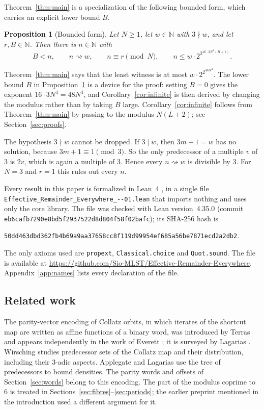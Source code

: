 \documentclass[11pt,reqno,oneside]{amsart}
\theoremstyle{plain}
\newtheorem{proposition}[theorem]{Proposition}
\theoremstyle{definition}
\numberwithin{equation}{section}
\newcommand{\lean}[1]{\texttt{#1}}
\begin{document}
Theorem~\ref{thm:main} is a specialization of the following bounded form, which carries an explicit lower bound $B$.

\begin{proposition}[Bounded form]\label{prop:bounded}
Let $N\ge1$, let $w\in\mathbb N$ with $3\nmid w$, and let $r,B\in\mathbb N$. Then there is $n\in\mathbb N$ with
\[
B<n,\qquad n\rightsquigarrow w,\qquad n\equiv r\pmod N,\qquad n\le w\cdot 2^{2^{16\cdot 3N^4(B+1)}}.
\]
\end{proposition}

Theorem~\ref{thm:main} says that the least witness is at most $w\cdot2^{2^{48N^4}}$. The lower bound $B$ in Proposition~\ref{prop:bounded} is a device for the proof: setting $B=0$ gives the exponent $16\cdot3N^4=48N^4$, and Corollary~\ref{cor:infinite} is then derived by changing the modulus rather than by taking $B$ large. Corollary~\ref{cor:infinite} follows from Theorem~\ref{thm:main} by passing to the modulus $N(L+2)$; see Section~\ref{sec:proofs}.

The hypothesis $3\nmid w$ cannot be dropped. If $3\mid w$, then $3m+1=w$ has no solution, because $3m+1\equiv1\pmod 3$. So the only predecessor of a multiple $v$ of $3$ is $2v$, which is again a multiple of $3$. Hence every $n\rightsquigarrow w$ is divisible by $3$. For $N=3$ and $r=1$ this rules out every $n$.

Every result in this paper is formalized in Lean~4 \cite{deMouraUllrich21}, in a single file \texttt{Effective\_\allowbreak Remainder\_\allowbreak Everywhere\_--\allowbreak 01.lean} that imports nothing and uses only the core library. The file was checked with Lean version~4.35.0 (commit \texttt{eb6cafb7290e8bd5f2937522d8d804f58f02bafc}); its SHA-256 hash is
\begin{center}\small\texttt{50dd463dbd362fb4b69a9aa37658cc8f119d99954ef685a56be7871ecd2a2db2}.\end{center}
The only axioms used are \lean{propext}, \lean{Classical.choice} and \lean{Quot.sound}. The file is available at \url{https://github.com/Sio-MLST/Effective-Remainder-Everywhere}. Appendix~\ref{app:names} lists every declaration of the file.

\subsection*{Related work}
The parity-vector encoding of Collatz orbits, in which iterates of the shortcut map are written as affine functions of a binary word, was introduced by Terras \cite{Terras76} and appears independently in the work of Everett \cite{Everett77}; it is surveyed by Lagarias \cite{Lagarias85}. Wirsching \cite{Wirsching98} studies predecessor sets of the Collatz map and their distribution, including their $3$-adic aspects. Applegate and Lagarias \cite{ApplegateLagarias95} use the tree of predecessors to bound densities. The parity words and offsets of Section~\ref{sec:words} belong to this encoding. The part of the modulus coprime to~$6$ is treated in Sections~\ref{sec:fibres}--\ref{sec:periods}; the earlier preprint mentioned in the introduction used a different argument for it.
\end{document}
